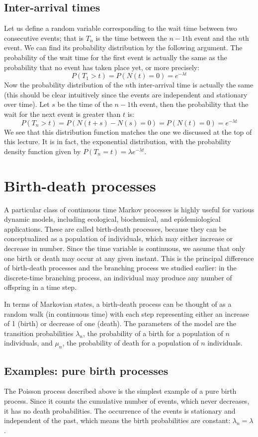 \documentclass[11pt]{book}
\begin{document}
\subsection{Inter-arrival times}
Let us define a random variable corresponding to the wait time between two consecutive events; that is $T_n$ is the time between the $n-1$th event and the $n$th event. We can find its probability distribution by the following argument. The probability of the wait time for the first event is actually the same as the probability that no event has taken place yet, or more precisely:
$$ P(T_1 > t ) = P(N(t) = 0) = e^{- \lambda t}$$
Now the probability distribution of the $n$th inter-arrival time is actually the same (this should be clear intuitively since the events are independent and stationary over time). Let $s$ be the time of the $n-1$th event, then the probability that the wait for the next event is greater than $t$ is:
$$ P(T_n > t) = P(N(t+s) - N(s) = 0) = P(N(t) = 0) = e^{-\lambda t}$$
We see that this distribution function matches the one we discussed at the top of this lecture. It is in fact, the exponential distribution, with the probability density function given by $P(T_n = t) = \lambda e^{-\lambda t}$.

\section{Birth-death processes}
A particular class of continuous time Markov processes is highly useful for various dynamic models, including ecological, biochemical, and epidemiological applications. These are called birth-death processes, because they can be conceptualized as a population of individuals, which may either increase or decrease in number. Since the time variable is continuous, we assume that only one birth or death may occur at any given instant. This is the principal difference of birth-death processes and the branching process we studied earlier: in the discrete-time branching process, an individual may produce any number of offspring in a time step. 

In terms of Markovian states, a birth-death process can be thought of as a random walk (in continuous time) with each step representing either an increase of 1 (birth) or decrease of one (death). The parameters of the model are the transition probabilities $\lambda_n$, the probability of a birth for a population of $n$ individuals, and $\mu_n$, the probability of death for a population of $n$ individuals.

\subsection{Examples: pure birth processes}
The Poisson process described above is the simplest example of a pure birth process. Since it counts the cumulative number of events, which never decreases, it has no death probabilities. The occurrence of the events is stationary and independent of the past, which means the birth probabilities are constant: $\lambda_n = \lambda$.
\end{document}
